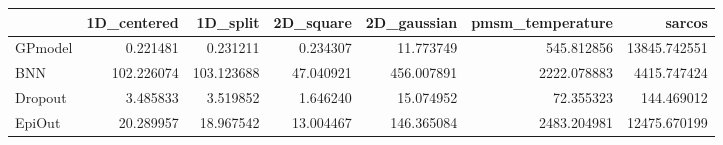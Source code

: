 \begin{tabular}{lrrrrrr}
\toprule
{} &  1D\_centered &    1D\_split &  2D\_square &  2D\_gaussian &  pmsm\_temperature &        sarcos \\
\midrule
GPmodel &     0.221481 &    0.231211 &   0.234307 &    11.773749 &        545.812856 &  13845.742551 \\
BNN     &   102.226074 &  103.123688 &  47.040921 &   456.007891 &       2222.078883 &   4415.747424 \\
Dropout &     3.485833 &    3.519852 &   1.646240 &    15.074952 &         72.355323 &    144.469012 \\
EpiOut  &    20.289957 &   18.967542 &  13.004467 &   146.365084 &       2483.204981 &  12475.670199 \\
\bottomrule
\end{tabular}
